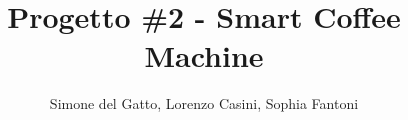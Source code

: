 \documentclass[a4paper]{article}
\begin{document}
\author{Simone del Gatto, Lorenzo Casini, Sophia Fantoni}
\title{Progetto \#2 - Smart Coffee Machine}
\maketitle
\newpage

\tableofcontents	%
\end{document}
